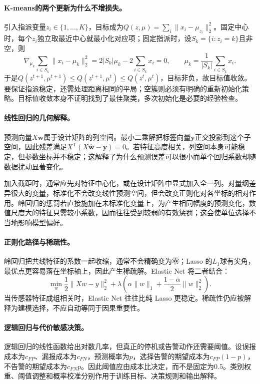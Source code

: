 \paragraph{K-means的两个更新为什么不增损失。}
引入指派变量$z_i\in\{1,\ldots,K\}$，目标成为$Q(z,\mu)=\sum_i\|x_i-\mu_{z_i}\|_2^2$。固定中心时，每个$z_i$独立取最近中心就最小化对应项；固定指派时，设$S_k=\{i:z_i=k\}$且非空，则
\begin{equation}
 \nabla_{\mu_k}\sum_{i\in S_k}\|x_i-\mu_k\|_2^2
 =2|S_k|\mu_k-2\sum_{i\in S_k}x_i=0,
 \qquad \mu_k=\frac1{|S_k|}\sum_{i\in S_k}x_i.
\end{equation}
于是$Q(z^{t+1},\mu^{t+1})\leq Q(z^{t+1},\mu^t)\leq Q(z^t,\mu^t)$，目标非负，故目标值收敛。要保证指派稳定，还需处理距离相同的平局；空簇则必须有明确的重新初始化策略。目标值收敛本身不证明找到了最佳聚类，多次初始化是必要的经验检查。

\paragraph{线性回归的几何解释。}
预测向量$X\bm w$属于设计矩阵的列空间。最小二乘解把标签向量$\bm y$正交投影到这个子空间，因此残差满足$X^{\mathsf T}(X\hat{\bm w}-\bm y)=0$。若特征高度相关，列空间本身可能稳定，但参数坐标并不稳定；这解释了为什么预测误差可以很小而单个回归系数却随数据扰动显著变化。

加入截距时，通常应先对特征中心化，或在设计矩阵中显式加入全一列。对量纲差异很大的变量，标准化不会改变线性预测空间，但会改变正则化对各坐标的相对作用。岭回归的惩罚若直接施加在未标准化变量上，为产生相同幅度的预测变化，数值尺度大的特征只需较小系数，因而往往受到较弱的有效惩罚；这会使单位选择不当地影响模型偏好。

\paragraph{正则化路径与稀疏性。}
岭回归把共线特征的系数一起收缩，通常不会精确变为零；Lasso 的$L_1$球有尖角，最优点更容易落在坐标轴上，因此产生稀疏解。Elastic Net 将二者结合：
\begin{equation}
 \min_w\frac12\|Xw-y\|_2^2+\lambda\left(\alpha\|w\|_1+\frac{1-\alpha}{2}\|w\|_2^2\right).
\end{equation}
当传感器特征成组相关时，Elastic Net 往往比纯 Lasso 更稳定。稀疏性仍应被解释为建模选择，不应自动等同于因果重要性。

\paragraph{逻辑回归与代价敏感决策。}
逻辑回归的线性函数给出对数几率，但真正的停机或告警动作还需要阈值。设误报成本为$c_{FP}$、漏报成本为$c_{FN}$，预测概率为$p$，选择告警的期望成本为$c_{FP}(1-p)$，不告警的期望成本为$c_{FN}p$。因此阈值应由成本比决定，而不是固定为$0.5$。类别权重、阈值调整和概率校准分别作用于训练目标、决策规则和输出解释。

